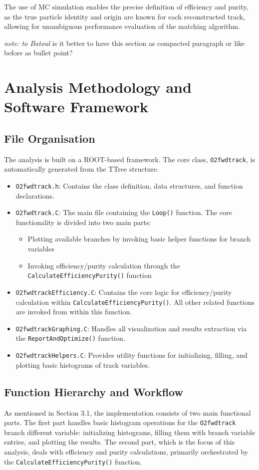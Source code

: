 \documentclass{article}
\begin{document}
The use of MC simulation enables the precise definition of efficiency and purity, as the true particle identity and origin are known for each reconstructed track, allowing for unambiguous performance evaluation of the matching algorithm.

\emph{note: to Batoul } is it better to have this section as compacted paragraph or like before as bullet point?  


\section{Analysis Methodology and Software Framework}

\subsection{File Organisation}
The analysis is built on a ROOT-based framework. The core class, \texttt{O2fwdtrack}, is automatically generated from the TTree structure.

\begin{itemize}
    \item \texttt{O2fwdtrack.h}: Contains the class definition, data structures, and function declarations.
    \item \texttt{O2fwdtrack.C}: The main file containing the \texttt{Loop()} function. The core functionality is divided into two main parts:
    \begin{itemize}
        \item Plotting available branches by invoking basic helper functions for branch variables
        \item Invoking efficiency/purity calculation through the \texttt{CalculateEfficiencyPurity()} function
    \end{itemize}
    \item \texttt{O2fwdtrackEfficiency.C}: Contains the core logic for efficiency/purity calculation within \texttt{CalculateEfficiencyPurity()}. All other related functions are invoked from within this function.
    \item \texttt{O2fwdtrackGraphing.C}: Handles all visualization and results extraction via the \texttt{ReportAndOptimize()} function.
    \item \texttt{O2fwdtrackHelpers.C}: Provides utility functions for initializing, filling, and plotting basic histograms of track variables.
\end{itemize}

\subsection{Function Hierarchy and Workflow}
As mentioned in Section 3.1, the implementation consists of two main functional parts. The first part handles basic histogram operations for the \texttt{O2fwdtrack} branch different variable: initializing histograms, filling them with branch variable entries, and plotting the results. The second part, which is the focus of this analysis, deals with efficiency and purity calculations, primarily orchestrated by the \texttt{CalculateEfficiencyPurity()} function.
\end{document}
